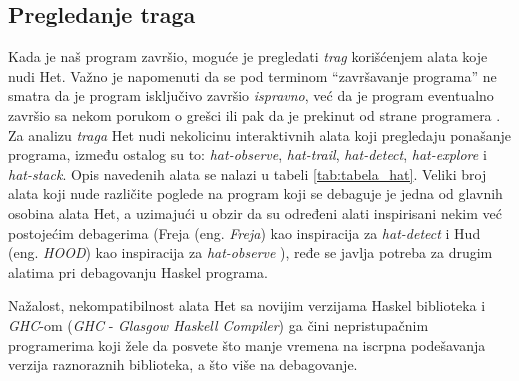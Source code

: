 \documentclass[a4paper]{article}
\begin{document}
{{\subsection{Pregledanje traga}
Kada je naš program završio, moguće je pregledati {\em trag} korišćenjem alata koje nudi Het. Važno je napomenuti da se pod terminom ``završavanje programa'' ne smatra 
da je program isključivo završio {\em ispravno}, već da je program eventualno završio sa nekom porukom o grešci ili pak da je prekinut od strane programera \cite{hat_haskell_org}.
Za analizu {\em traga} Het nudi nekolicinu interaktivnih alata koji pregledaju ponašanje programa, 
između ostalog su to: {\em hat-observe}, {\em hat-trail}, {\em hat-detect}, {\em hat-explore} i {\em hat-stack}. Opis navedenih alata se nalazi u tabeli \ref{tab:tabela_hat}.
Veliki broj alata koji nude različite poglede na program koji se debaguje je jedna od glavnih osobina alata Het, a uzimajući u obzir da su određeni alati inspirisani nekim već postojećim debagerima (Freja (eng. {\em Freja}) kao inspiracija za {\em hat-detect} i Hud (eng. {\em HOOD}) kao inspiracija za {\em hat-observe} \cite{hat_haskell_org}), ređe se javlja potreba za drugim alatima pri debagovanju Haskel programa.

Nažalost, nekompatibilnost alata Het sa novijim verzijama Haskel biblioteka i {\em GHC}-om ({\em GHC} - {\em Glasgow Haskell Compiler}) ga čini nepristupačnim programerima 
koji žele da posvete što manje vremena na iscrpna podešavanja verzija raznoraznih biblioteka, a što više na debagovanje.

}}
\end{document}
